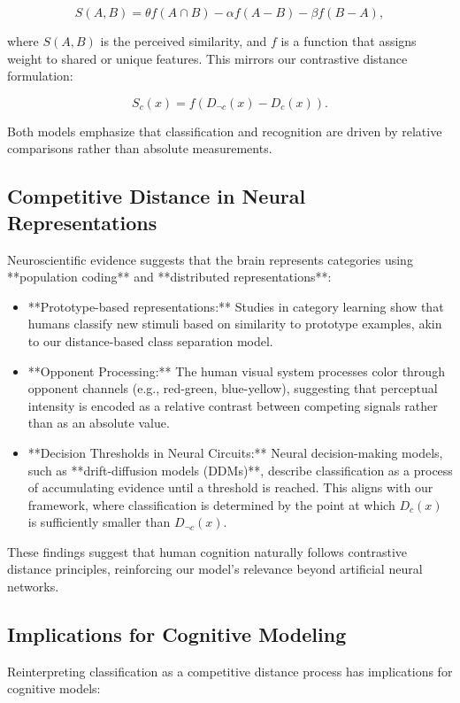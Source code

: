 \[
S(A, B) = \theta f(A \cap B) - \alpha f(A - B) - \beta f(B - A),
\]

where \( S(A, B) \) is the perceived similarity, and \( f \) is a function that assigns weight to shared or unique features. This mirrors our contrastive distance formulation:

\[
S_c(x) = f(D_{\neg c}(x) - D_c(x)).
\]

Both models emphasize that classification and recognition are driven by relative comparisons rather than absolute measurements.

\subsection{Competitive Distance in Neural Representations}

Neuroscientific evidence suggests that the brain represents categories using **population coding** and **distributed representations**:

\begin{itemize}
    \item **Prototype-based representations:** Studies in category learning show that humans classify new stimuli based on similarity to prototype examples, akin to our distance-based class separation model.
    \item **Opponent Processing:** The human visual system processes color through opponent channels (e.g., red-green, blue-yellow), suggesting that perceptual intensity is encoded as a relative contrast between competing signals rather than as an absolute value.
    \item **Decision Thresholds in Neural Circuits:** Neural decision-making models, such as **drift-diffusion models (DDMs)**, describe classification as a process of accumulating evidence until a threshold is reached. This aligns with our framework, where classification is determined by the point at which \( D_c(x) \) is sufficiently smaller than \( D_{\neg c}(x) \).
\end{itemize}

These findings suggest that human cognition naturally follows contrastive distance principles, reinforcing our model's relevance beyond artificial neural networks.

\subsection{Implications for Cognitive Modeling}

Reinterpreting classification as a competitive distance process has implications for cognitive models:

